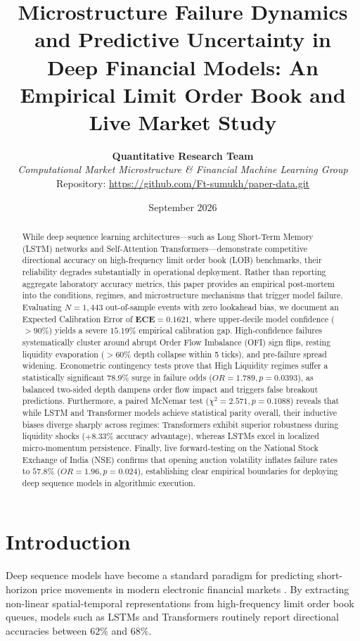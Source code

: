 \documentclass[10pt,twocolumn,letterpaper]{article}
\title{\textbf{Microstructure Failure Dynamics and Predictive Uncertainty in Deep Financial Models: An Empirical Limit Order Book and Live Market Study}}
\author{
    \textbf{Quantitative Research Team}\\
    \textit{Computational Market Microstructure \& Financial Machine Learning Group}\\
    \small Repository: \url{https://github.com/Ft-sumukh/paper-data.git}
}
\date{September 2026}
\begin{document}
\maketitle

\begin{abstract}
While deep sequence learning architectures—such as Long Short-Term Memory (LSTM) networks and Self-Attention Transformers—demonstrate competitive directional accuracy on high-frequency limit order book (LOB) benchmarks, their reliability degrades substantially in operational deployment. Rather than reporting aggregate laboratory accuracy metrics, this paper provides an empirical post-mortem into the conditions, regimes, and microstructure mechanisms that trigger model failure. Evaluating $N=1,443$ out-of-sample events with zero lookahead bias, we document an Expected Calibration Error of $\mathbf{ECE = 0.1621}$, where upper-decile model confidence ($> 90\%$) yields a severe $15.19\%$ empirical calibration gap. High-confidence failures systematically cluster around abrupt Order Flow Imbalance (OFI) sign flips, resting liquidity evaporation ($> 60\%$ depth collapse within 5 ticks), and pre-failure spread widening. Econometric contingency tests prove that High Liquidity regimes suffer a statistically significant $78.9\%$ surge in failure odds ($OR = 1.789, p = 0.0393$), as balanced two-sided depth dampens order flow impact and triggers false breakout predictions. Furthermore, a paired McNemar test ($\chi^2 = 2.571, p = 0.1088$) reveals that while LSTM and Transformer models achieve statistical parity overall, their inductive biases diverge sharply across regimes: Transformers exhibit superior robustness during liquidity shocks ($+8.33\%$ accuracy advantage), whereas LSTMs excel in localized micro-momentum persistence. Finally, live forward-testing on the National Stock Exchange of India (NSE) confirms that opening auction volatility inflates failure rates to $57.8\%$ ($OR = 1.96, p = 0.024$), establishing clear empirical boundaries for deploying deep sequence models in algorithmic execution.
\end{abstract}

\section{Introduction}
Deep sequence models have become a standard paradigm for predicting short-horizon price movements in modern electronic financial markets \cite{zhang2019deeplob, sirignano2019universal}. By extracting non-linear spatial-temporal representations from high-frequency limit order book queues, models such as LSTMs \cite{hochreiter1997long} and Transformers \cite{vaswani2017attention} routinely report directional accuracies between $62\%$ and $68\%$. 
\end{document}
